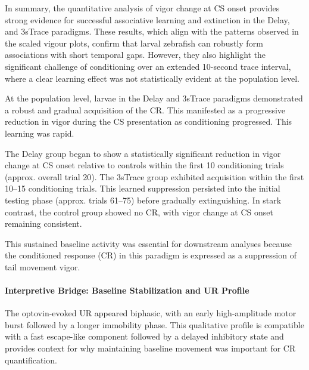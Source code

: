 
In summary, the quantitative analysis of vigor change at CS onset provides strong evidence for successful associative learning and extinction in the Delay, and 3sTrace paradigms. These results, which align with the patterns observed in the scaled vigour plots, confirm that larval zebrafish can robustly form associations with short temporal gaps. However, they also highlight the significant challenge of conditioning over an extended 10-second trace interval, where a clear learning effect was not statistically evident at the population level.

At the population level, larvae in the Delay and 3sTrace paradigms demonstrated a robust and gradual acquisition of the CR. This manifested as a progressive reduction in vigor during the CS presentation as conditioning progressed. This learning was rapid.

The Delay group began to show a statistically significant reduction in vigor change at CS onset relative to controls within the first 10 conditioning trials (approx. overall trial 20).
The 3sTrace group exhibited acquisition within the first 10--15 conditioning trials.
This learned suppression persisted into the initial testing phase (approx. trials 61--75) before gradually extinguishing. In stark contrast, the control group showed no CR, with vigor change at CS onset remaining consistent.


This sustained baseline activity was essential for downstream analyses because the conditioned response (CR) in this paradigm is expressed as a suppression of tail movement vigor.




\paragraph{Interpretive Bridge: Baseline Stabilization and UR Profile}
The optovin-evoked UR appeared biphasic, with an early high-amplitude motor burst followed by a longer immobility phase. This qualitative profile is compatible with a fast escape-like component followed by a delayed inhibitory state and provides context for why maintaining baseline movement was important for CR quantification.



